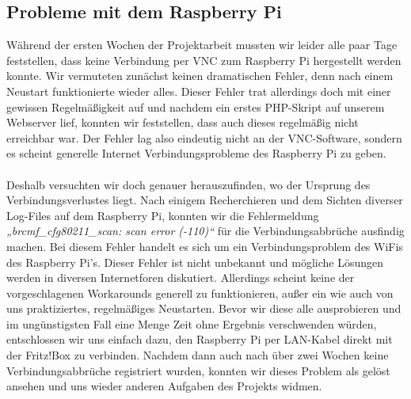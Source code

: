 \subsection{Probleme mit dem Raspberry Pi}
Während der ersten Wochen der Projektarbeit mussten wir leider alle paar Tage feststellen, dass keine Verbindung per VNC zum Raspberry Pi hergestellt werden konnte. Wir vermuteten zunächst keinen dramatischen Fehler, denn nach einem Neustart funktionierte wieder alles. Dieser Fehler trat allerdings doch mit einer gewissen Regelmäßigkeit auf und nachdem ein erstes PHP-Skript auf unserem Webserver lief, konnten wir feststellen, dass auch  dieses  regelmäßig nicht erreichbar war. Der Fehler lag also eindeutig nicht  an der VNC-Software, sondern es scheint generelle Internet Verbindungsprobleme des Raspberry Pi zu geben.
\\
\\
Deshalb versuchten wir doch genauer herauszufinden, wo der Ursprung des Verbindungsverlustes liegt. Nach einigem Recherchieren und dem Sichten diverser Log-Files auf dem Raspberry Pi, konnten wir die Fehlermeldung \textit{„brcmf\_cfg80211\_scan: scan error (-110)“} für die Verbindungsabbrüche ausfindig machen. Bei diesem Fehler handelt es sich um ein Verbindungsproblem des WiFis des Raspberry Pi’s. Dieser Fehler ist nicht unbekannt und mögliche Lösungen werden in diversen Internetforen diskutiert. Allerdings scheint keine der vorgeschlagenen Workarounds generell zu funktionieren, außer ein wie auch von uns praktiziertes, regelmäßiges Neustarten. Bevor wir diese alle ausprobieren und im ungünstigsten Fall eine Menge Zeit ohne Ergebnis verschwenden würden, entschlossen wir uns einfach dazu, den Raspberry Pi per LAN-Kabel direkt mit der Fritz!Box zu verbinden. Nachdem dann auch nach über zwei Wochen keine Verbindungsabbrüche registriert wurden, konnten wir dieses Problem als gelöst ansehen und uns wieder anderen Aufgaben des Projekts widmen.
\\
\\
